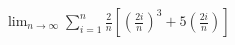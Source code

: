 \item $\displaystyle \lim_{n \to \infty} \sum_{i=1}^n \frac{2}{n} \left[ \left( \frac{2i}{n} \right)^3 + 5 \left( \frac{2i}{n} \right) \right]$
